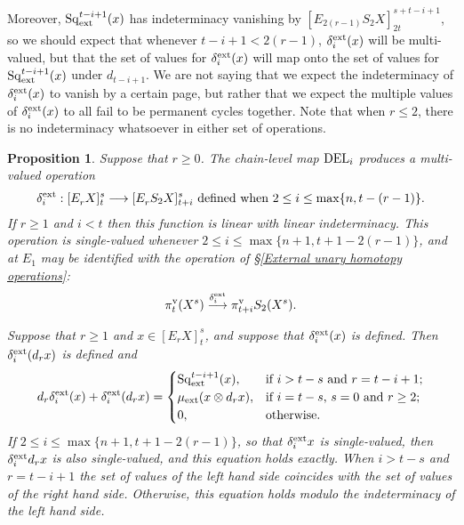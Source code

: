 \documentclass[11pt]{amsart} \renewcommand{\baselinestretch}{1.2}
\theoremstyle{plain}
\newtheorem{prop}[thm]{Proposition}
\numberwithin{equation}{section} %
\theoremstyle{plain}
\newtheorem{prop}[thm]{Proposition}
\numberwithin{equation}{chapter} %
\renewcommand{\to}{\longrightarrow}
\newcommand{\Sq}{\mathrm{Sq}}
\newcommand{\E}[5]{[E^{#1}_{#2}#3]^{#4}_{#5}}
\newcommand{\Edownup}[5]{[E_{#1}^{#2}#3]^{#4}_{#5}}
\newcommand{\uver}{^\mathrm{v}}
\begin{document}
\begin{second quadrant homotopy sseq operations}
Moreover,  $\Sq^{t-i+1}_\textup{ext}(x)$ has indeterminacy vanishing by $\Edownup{2(r-1)}{}{S_2X}{s+t-i+1}{2t}$, so we should expect that whenever $t-i+1<2(r-1)$, $\delta^\textup{ext}_i(x)$ will be multi-valued, but that the set of values for $\delta^\textup{ext}_i(x)$ will map onto the set of values for $\Sq_\textup{ext}^{t-i+1}(x)$ under $d_{t-i+1}$. 
We are not saying that we expect the indeterminacy of $\delta^\textup{ext}_i(x)$ to vanish by a certain page, but rather that we expect the  multiple values of $\delta^\textup{ext}_i(x)$ to all fail to be permanent cycles together. Note that when $r\leq 2$, there is no indeterminacy whatsoever in either set of operations.
\begin{prop}
\label{Prop on delta external}
Suppose that $r\geq0$. The chain-level map $\textup{DEL}_i$ produces a  multi-valued operation 
\[\delta^\textup{ext}_i:\Edownup{r}{}{X}{s}{t}\to \Edownup{r}{}{S_2X}{s}{t+i}\text{ defined when }2\leq i\leq \max\{n,t-(r-1)\}.\] If $r\geq1$ and $i<t$ then this function is linear with linear indeterminacy. This operation is single-valued whenever $2\leq i\leq \max\{n+1,t+1-2(r-1)\}$, and at $E_1$ may be identified with the operation of \S\ref{External unary homotopy operations}:
\[\pi\uver_{t}( X^s)\overset{\delta_i^\textup{ext}}{\to} \pi\uver_{t+i}S_2(X^s).\]

Suppose that $r\geq1$ and $x\in \E{}{r}{X}{s}{t}$, and suppose that $\delta^\textup{ext}_i ( x)$ is defined. Then $\delta^\textup{ext}_i (d_r x)$ is defined and 
\[d_r\delta^\textup{ext}_i(x)+ \delta^\textup{ext}_i(d_rx)=\begin{cases}
\Sq_\textup{ext}^{t-i+1}(x),&\textup{if $i>t-s$ and $r =t-i+1$};\\
\mu_\textup{ext}(x\otimes d_rx),&\textup{if $i=t-s$,  $s=0$ and $r\geq2$};\\
0,&\textup{otherwise.}
\end{cases}\]
If $2\leq i\leq \max\{n+1,t+1-2(r-1)\}$, so that $\delta^\textup{ext}_i x$ is single-valued, then $\delta^\textup{ext}_i d_r x$  is also single-valued, and this equation holds exactly.  When $i>t-s$ and $r =t-i+1$ the set of values of the left hand side coincides with the set of values of the right hand side. Otherwise, this equation holds modulo the indeterminacy of the left hand side. 


\end{prop}
\end{second quadrant homotopy sseq operations}
\end{document}
